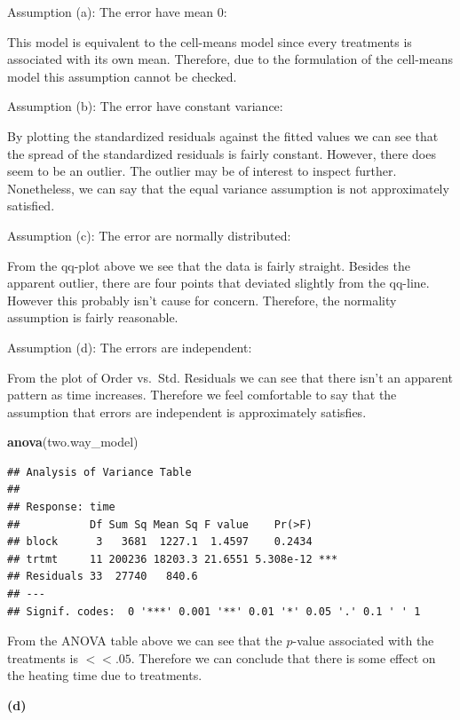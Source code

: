 \documentclass[12pt,]{article}
\newenvironment{Shaded}{\begin{snugshade}}{\end{snugshade}}
\newcommand{\KeywordTok}[1]{\textcolor[rgb]{0.13,0.29,0.53}{\textbf{#1}}}
\newcommand{\NormalTok}[1]{#1}
\begin{document}
Assumption (a): The error have mean 0:

This model is equivalent to the cell-means model since every treatments
is associated with its own mean. Therefore, due to the formulation of
the cell-means model this assumption cannot be checked.

Assumption (b): The error have constant variance:

By plotting the standardized residuals against the fitted values we can
see that the spread of the standardized residuals is fairly constant.
However, there does seem to be an outlier. The outlier may be of
interest to inspect further. Nonetheless, we can say that the equal
variance assumption is not approximately satisfied.

Assumption (c): The error are normally distributed:

From the qq-plot above we see that the data is fairly straight. Besides
the apparent outlier, there are four points that deviated slightly from
the qq-line. However this probably isn't cause for concern. Therefore,
the normality assumption is fairly reasonable.

Assumption (d): The errors are independent:

From the plot of Order vs.~Std. Residuals we can see that there isn't an
apparent pattern as time increases. Therefore we feel comfortable to say
that the assumption that errors are independent is approximately
satisfies.

\begin{Shaded}
\begin{Highlighting}[]
\KeywordTok{anova}\NormalTok{(two.way_model)}
\end{Highlighting}
\end{Shaded}

\begin{verbatim}
## Analysis of Variance Table
## 
## Response: time
##           Df Sum Sq Mean Sq F value    Pr(>F)    
## block      3   3681  1227.1  1.4597    0.2434    
## trtmt     11 200236 18203.3 21.6551 5.308e-12 ***
## Residuals 33  27740   840.6                      
## ---
## Signif. codes:  0 '***' 0.001 '**' 0.01 '*' 0.05 '.' 0.1 ' ' 1
\end{verbatim}

From the ANOVA table above we can see that the \(p\)-value associated
with the treatments is \(<< .05\). Therefore we can conclude that there
is some effect on the heating time due to treatments.

\textbf{(d)}
\end{document}
